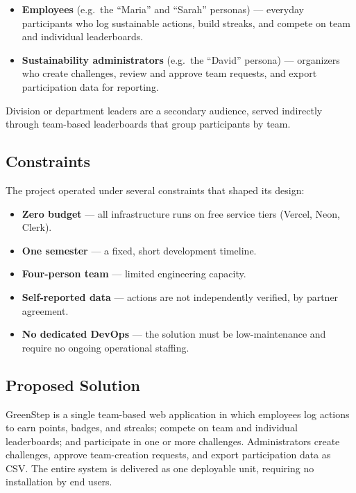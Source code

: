 \documentclass[12pt]{article}
\begin{document}
\begin{itemize}
    \item \textbf{Employees} (e.g.\ the ``Maria'' and ``Sarah'' personas) ---
    everyday participants who log sustainable actions, build streaks, and
    compete on team and individual leaderboards.
    \item \textbf{Sustainability administrators} (e.g.\ the ``David'' persona)
    --- organizers who create challenges, review and approve team requests,
    and export participation data for reporting.
\end{itemize}

Division or department leaders are a secondary audience, served indirectly
through team-based leaderboards that group participants by team.

\subsection{Constraints}

The project operated under several constraints that shaped its design:

\begin{itemize}
    \item \textbf{Zero budget} --- all infrastructure runs on free service
    tiers (Vercel, Neon, Clerk).
    \item \textbf{One semester} --- a fixed, short development timeline.
    \item \textbf{Four-person team} --- limited engineering capacity.
    \item \textbf{Self-reported data} --- actions are not independently
    verified, by partner agreement.
    \item \textbf{No dedicated DevOps} --- the solution must be low-maintenance
    and require no ongoing operational staffing.
\end{itemize}

\subsection{Proposed Solution}

GreenStep is a single team-based web application in which employees log
actions to earn points, badges, and streaks; compete on team and individual
leaderboards; and participate in one or more challenges. Administrators create
challenges, approve team-creation requests, and export participation data as
CSV. The entire system is delivered as one deployable unit, requiring no
installation by end users.
\end{document}
